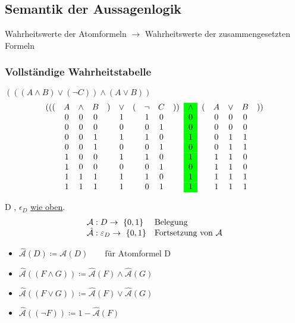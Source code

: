 \subsection{Semantik der Aussagenlogik}
Wahrheitswerte der Atomformeln $\rightarrow$ Wahrheitswerte der zusammengesetzten Formeln
\subsubsection{Vollständige Wahrheitstabelle}
$((( A \wedge B ) \vee ( \neg C )) \wedge ( A \vee B ))$
\begin{gather*}
	\begin{array}{ c c c c c c c c c c >{\columncolor{green}}c c c c c c }
		(((	& A	& \wedge	& B	& )	& \vee	& (	& \neg	& C	& ))	& \wedge	& (	& A	& \vee	& B	& ))	\\
			& 0	& 0		& 0	&	& 1		&	& 1		& 0	&	& 0		&	& 0	& 0		& 0		\\
			& 0	& 0		& 0	&	& 0		&	& 0		& 1	&	& 0		&	& 0	& 0		& 0		\\
			& 0	& 0		& 1	&	& 1		&	& 1		& 0	&	& 1		&	& 0	& 1		& 1		\\
			& 0	& 0		& 1	&	& 0		&	& 0		& 1	&	& 0		&	& 0	& 1		& 1		\\
			& 1	& 0		& 0	&	& 1		&	& 1		& 0	&	& 1		&	& 1	& 1		& 0		\\
			& 1	& 0		& 0	&	& 0		&	& 0		& 1	&	& 0		&	& 1	& 1		& 0		\\
			& 1	& 1		& 1	&	& 1		&	& 1		& 0	&	& 1		&	& 1	& 1		& 1		\\
			& 1	& 1		& 1	&	& 1		&	& 0		& 1	&	& 1		&	& 1	& 1		& 1		
	\end{array}
\end{gather*}
\begin{def*}[note = Belegung , index = Belegung]
	D , $\epsilon_D$ \hyperref[Formel!korrekte]{wie oben}. \\
	\begin{gather*}
		\begin{array}{ l l }
			\mathcal{A} : D \rightarrow \{ 0 , 1 \}				& \text{Belegung} \\
			\mathcal{\hat{A}} : \varepsilon_D \rightarrow \{ 0 , 1 \}	& \text{Fortsetzung von } \mathcal{A}
		\end{array}
	\end{gather*}
	\begin{itemize}
		\item $\mathcal{\hat{A}}( D ) \coloneqq \mathcal{A}( D ) \qquad \text{für Atomformel D}$
		\item $\mathcal{\hat{A}}(( F \wedge G )) \coloneqq \mathcal{\hat{A}}( F ) \wedge \mathcal{\hat{A}}( G )$
		\item $\mathcal{\hat{A}}(( F \vee G )) \coloneqq \mathcal{\hat{A}}( F ) \vee \mathcal{\hat{A}}( G )$
		\item $\mathcal{\hat{A}}(( \neg F )) \coloneqq 1 - \mathcal{\hat{A}}( F )$
	\end{itemize}
\end{def*}

